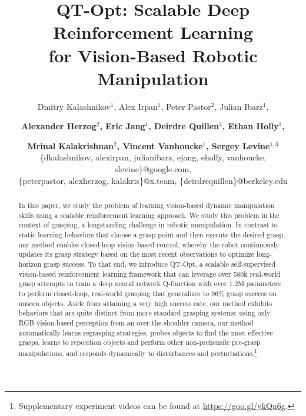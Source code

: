 \documentclass{article}
\title{QT-Opt: Scalable Deep Reinforcement Learning\\ for Vision-Based Robotic Manipulation} %
\author{
Dmitry Kalashnikov$^1$, Alex Irpan$^1$, Peter Pastor$^2$, Julian Ibarz$^1$,\\ \and
\textbf{Alexander Herzog$^2$, Eric Jang$^1$,
Deirdre Quillen$^3$, Ethan Holly$^1$,}\\ \and
\textbf{Mrinal Kalakrishnan$^2$, Vincent Vanhoucke$^1$, Sergey Levine$^{1,3}$} \\
\{dkalashnikov, alexirpan, julianibarz, ejang, eholly, vanhoucke, slevine\}@google.com,\\
\{peterpastor, alexherzog, kalakris\}@x.team, \{deirdrequillen\}@berkeley.edu
}
\newcommand{\numgrasps}{{580k}} %
\newcommand{\modelparams}{{1.2M}} %
\newcommand{\siteurl}{\url{https://goo.gl/ykQn6g}}
\begin{document}
\setcounter{footnote}{3}

\maketitle

\begin{abstract}
In this paper, we study the problem of learning vision-based dynamic manipulation skills using a scalable reinforcement learning approach. We study this problem in the context of grasping, a longstanding challenge in robotic manipulation. In contrast to static learning behaviors that choose a grasp point and then execute the desired grasp, our method enables closed-loop vision-based control, whereby the robot continuously updates its grasp strategy based on the most recent observations to optimize long-horizon grasp success. To that end, we introduce QT-Opt, a scalable self-supervised vision-based reinforcement learning framework that can leverage over \numgrasps{} real-world grasp attempts to train a deep neural network Q-function with over \modelparams{} parameters to perform closed-loop, real-world grasping that generalizes to 96\% grasp success on unseen objects. Aside from attaining a very high success rate, our method exhibits behaviors that are quite distinct from more standard grasping systems: using only RGB vision-based perception from an over-the-shoulder camera, our method automatically learns regrasping strategies, probes objects to find the most effective grasps, learns to reposition objects and perform other non-prehensile pre-grasp manipulations, and responds dynamically to disturbances and perturbations.\footnote{Supplementary experiment videos can be found at \siteurl.}

\end{abstract}

\end{document}
